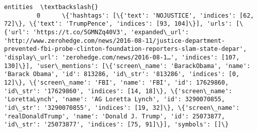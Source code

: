 \documentclass[11pt]{article}
\begin{document}
\begin{Verbatim}[commandchars=\\\{\}]
                                                                                                                                                                                                                                                                                                                                                                                                                                                                                                                                                                                                                                                                                                                                                                                                                                                                                                                                                                                                                                                                                                                                                                                                                    entities  \textbackslash{}
         0      \{'hashtags': [\{'text': 'NOJUSTICE', 'indices': [62, 72]\}, \{'text': 'TrumpPence', 'indices': [93, 104]\}], 'urls': [\{'url': 'https://t.co/5GMNZq40V3', 'expanded\_url': 'http://www.zerohedge.com/news/2016-08-11/justice-department-prevented-fbi-probe-clinton-foundation-reporters-slam-state-depar', 'display\_url': 'zerohedge.com/news/2016-08-1…', 'indices': [107, 130]\}], 'user\_mentions': [\{'screen\_name': 'BarackObama', 'name': 'Barack Obama', 'id': 813286, 'id\_str': '813286', 'indices': [0, 12]\}, \{'screen\_name': 'FBI', 'name': 'FBI', 'id': 17629860, 'id\_str': '17629860', 'indices': [14, 18]\}, \{'screen\_name': 'LorettaLynch', 'name': 'AG Loretta Lynch', 'id': 3290070855, 'id\_str': '3290070855', 'indices': [19, 32]\}, \{'screen\_name': 'realDonaldTrump', 'name': 'Donald J. Trump', 'id': 25073877, 'id\_str': '25073877', 'indices': [75, 91]\}], 'symbols': []\}                                                                                                                                                                                                                                                                                                                         

\end{Verbatim}
\end{document}

